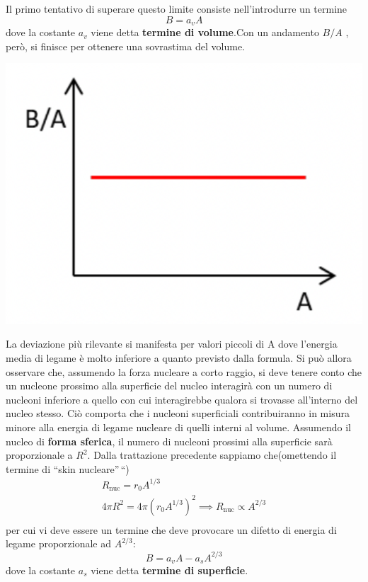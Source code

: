 Il primo tentativo di superare questo limite consiste nell'introdurre un
termine \[
	B = a_{v} A
\] dove la costante \(a_{v}\) viene detta \textbf{termine di volume}.Con
un andamento \(B / A\) , però, si finisce per ottenere una sovrastima
del volume.
\begin{marginfigure}
	\includegraphics{figs/goccia1}
	\label{fig:goccia1}
\end{marginfigure}
La deviazione più rilevante si manifesta per valori piccoli di A dove
l'energia media di legame è molto inferiore a quanto previsto dalla
formula.
Si può allora osservare che, assumendo la forza nucleare a
corto raggio, si deve tenere conto che un nucleone prossimo alla
superficie del nucleo interagirà con un numero di nucleoni inferiore a
quello con cui interagirebbe qualora si trovasse all'interno del nucleo
stesso.
Ciò comporta che i nucleoni superficiali contribuiranno in
misura minore alla energia di legame nucleare di quelli interni al
volume.
Assumendo il nucleo di \textbf{forma sferica}, il numero di
nucleoni prossimi alla superficie sarà proporzionale a \(R^{2}\).
Dalla
trattazione precedente sappiamo che(omettendo il termine di ``skin
nucleare''\,``) \begin{gather*}
	R_{\text{nuc}} = r_{0}A^{1/3}\\
	4 \pi R^{2} = 4 \pi (r_{0}A^{1/3})^2 \implies R_{\text{nuc}} \propto A^{2/3}\\
\end{gather*} per cui vi deve essere un termine che deve provocare un difetto di
energia di legame proporzionale ad \(A^{2/3}\): \[
	B = a_{v}A - a_{s}A^{2/3}
\] dove la costante \(a_{s}\) viene detta \textbf{termine di
	superficie}.
